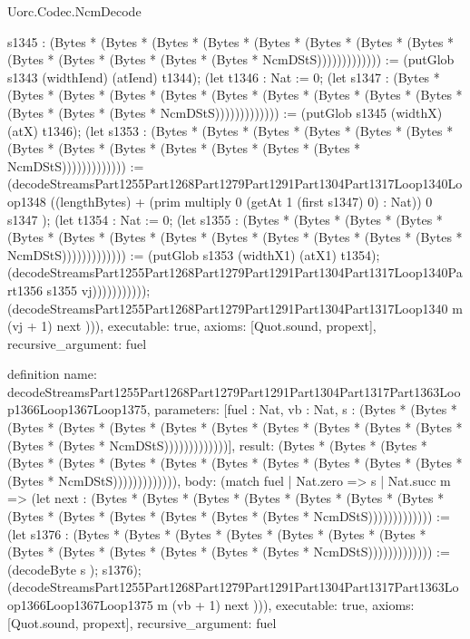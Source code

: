 \begin{lexlean}{Uorc.Codec.NcmDecode}
\begin{semanticmodule}
{s1345 : (Bytes * (Bytes * (Bytes * (Bytes * (Bytes * (Bytes * (Bytes * (Bytes * (Bytes * (Bytes * (Bytes * (Bytes * (Bytes * NcmDStS))))))))))))) := (putGlob s1343 (widthIend) (atIend) t1344); (let t1346 : Nat := 0; (let s1347 : (Bytes * (Bytes * (Bytes * (Bytes * (Bytes * (Bytes * (Bytes * (Bytes * (Bytes * (Bytes * (Bytes * (Bytes * (Bytes * NcmDStS))))))))))))) := (putGlob s1345 (widthX) (atX) t1346); (let s1353 : (Bytes * (Bytes * (Bytes * (Bytes * (Bytes * (Bytes * (Bytes * (Bytes * (Bytes * (Bytes * (Bytes * (Bytes * (Bytes * NcmDStS))))))))))))) := (decodeStreamsPart1255Part1268Part1279Part1291Part1304Part1317Loop1340Loop1348 ((lengthBytes) + (prim multiply 0 (getAt 1 (first s1347) 0) : Nat)) 0 s1347 ); (let t1354 : Nat := 0; (let s1355 : (Bytes * (Bytes * (Bytes * (Bytes * (Bytes * (Bytes * (Bytes * (Bytes * (Bytes * (Bytes * (Bytes * (Bytes * (Bytes * NcmDStS))))))))))))) := (putGlob s1353 (widthX1) (atX1) t1354); (decodeStreamsPart1255Part1268Part1279Part1291Part1304Part1317Loop1340Part1356 s1355 vj))))))))))); (decodeStreamsPart1255Part1268Part1279Part1291Part1304Part1317Loop1340 m (vj + 1) next ))),
  executable: true,
  axioms: [Quot.sound, propext],
  recursive_argument: fuel
}

definition{
  name: decodeStreamsPart1255Part1268Part1279Part1291Part1304Part1317Part1363Loop1366Loop1367Loop1375,
  parameters: [fuel : Nat, vb : Nat, s : (Bytes * (Bytes * (Bytes * (Bytes * (Bytes * (Bytes * (Bytes * (Bytes * (Bytes * (Bytes * (Bytes * (Bytes * (Bytes * NcmDStS)))))))))))))],
  result: (Bytes * (Bytes * (Bytes * (Bytes * (Bytes * (Bytes * (Bytes * (Bytes * (Bytes * (Bytes * (Bytes * (Bytes * (Bytes * NcmDStS))))))))))))),
  body: (match fuel
    | Nat.zero => s
    | Nat.succ m => (let next : (Bytes * (Bytes * (Bytes * (Bytes * (Bytes * (Bytes * (Bytes * (Bytes * (Bytes * (Bytes * (Bytes * (Bytes * (Bytes * NcmDStS))))))))))))) := (let s1376 : (Bytes * (Bytes * (Bytes * (Bytes * (Bytes * (Bytes * (Bytes * (Bytes * (Bytes * (Bytes * (Bytes * (Bytes * (Bytes * NcmDStS))))))))))))) := (decodeByte s ); s1376); (decodeStreamsPart1255Part1268Part1279Part1291Part1304Part1317Part1363Loop1366Loop1367Loop1375 m (vb + 1) next ))),
  executable: true,
  axioms: [Quot.sound, propext],
  recursive_argument: fuel
}


\end{semanticmodule}
\end{lexlean}
